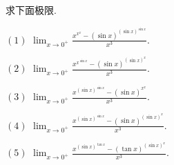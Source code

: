 \begin{exercise}{}
求下面极限.

$(1)$ ${\displaystyle \lim_{x\to0^{+}}\frac{x^{x^{x}}-(\sin x)^{(\sin x)^{\sin x}}}{x^{3}}.}$

$(2)$ ${\displaystyle \lim_{x\to0^{+}}\frac{x^{x^{\sin x}}-(\sin x)^{(\sin x)^{x}}}{x^{3}}.}$

$(3)$ ${\displaystyle \lim_{x\to0^{+}}\frac{x^{(\sin x)^{\sin x}}-(\sin x)^{x^{x}}}{x^{3}}.}$

$(4)$ ${\displaystyle \lim_{x\to0^{+}}\frac{x^{(\sin x)^{\sin x}}-(\sin x)^{(\sin x)^{x}}}{x^{3}}.}$

$(5)$ ${\displaystyle \lim_{x\to0^{+}}\frac{x^{(\sin x)^{\tan x}}-(\tan x)^{(\sin x)^{x}}}{x^{3}}.}$

\end{exercise}